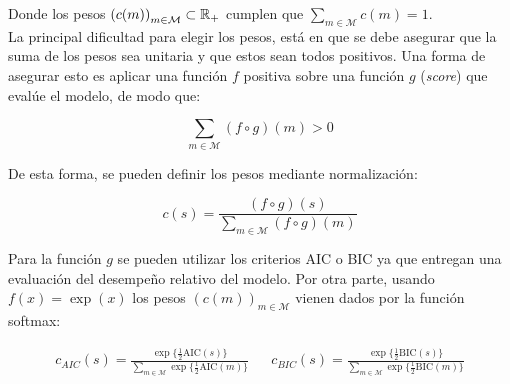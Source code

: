 Donde los pesos $\left(c(m)\right)_{m\in\mathcal{M}}\subset\mathbb{R}_+$ cumplen que $\sum_{m\in \mathcal{M}} c(m) = 1$.\\

La principal dificultad para elegir los pesos, está en que se debe asegurar que la suma de los pesos sea unitaria y que estos sean todos positivos. Una forma de asegurar esto es aplicar una función $f$ positiva sobre una función $g$ (\emph{score}) que evalúe el modelo, de modo que:

\begin{equation}
\sum_{m\in \mathcal{M}} (f\circ g)(m) > 0
\end{equation}

De esta forma, se pueden definir los pesos mediante normalización:

\begin{equation}
c(s) = \frac{(f\circ g)(s)}{\sum_{m\in \mathcal{M}} (f\circ g)(m)}
\end{equation}

Para la función $g$ se pueden utilizar los criterios AIC o BIC ya que entregan una evaluación del desempeño relativo del modelo. Por otra parte, usando $f(x)=\exp(x)$ los pesos $\left(c(m)\right)_{m\in\mathcal{M}}$ vienen dados por la función softmax:



\begin{align}
c_{AIC}(s) = \frac{\exp\{ \frac{1}{2} \text{AIC}(s)\}}{\sum_{m\in \mathcal{M}} \exp\{ \frac{1}{2} \text{AIC}(m)\}} & & c_{BIC}(s) = \frac{\exp\{ \frac{1}{2} \text{BIC}(s)\}}{\sum_{m\in \mathcal{M}} \exp\{ \frac{1}{2} \text{BIC}(m)\}}
\end{align}
